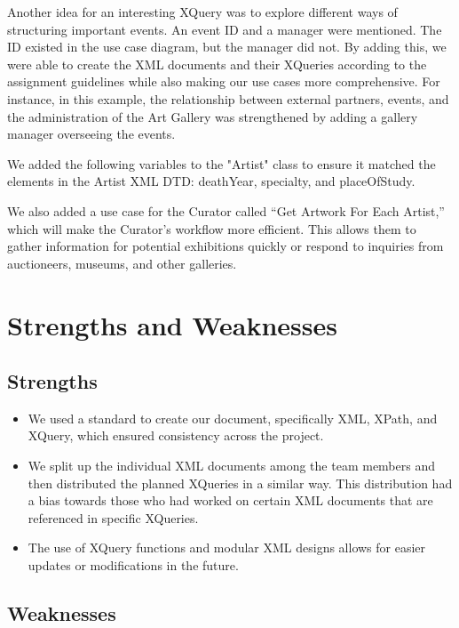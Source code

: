 \documentclass{article} %
\begin{document}
Another idea for an interesting XQuery was to explore different ways of structuring 
important events. An event ID and a manager were mentioned. The ID existed in the use 
case diagram, but the manager did not. By adding this, we were able to create the XML 
documents and their XQueries according to the assignment guidelines while also making 
our use cases more comprehensive. For instance, in this example, the relationship 
between external partners, events, and the administration of the Art Gallery was 
strengthened by adding a gallery manager overseeing the events.

We added the following variables to the "Artist" class to ensure it matched the 
elements in the Artist XML DTD: deathYear, specialty, and placeOfStudy.

We also added a use case for the Curator called “Get Artwork For Each Artist,” which 
will make the Curator's workflow more efficient. This allows them to gather 
information for potential exhibitions quickly or respond to inquiries from auctioneers, 
museums, and other galleries.

\section{Strengths and Weaknesses}
\subsection{Strengths}

\begin{itemize}
    \item We used a standard to create our document, specifically XML, XPath, and XQuery, which ensured consistency across the project.
    \item We split up the individual XML documents among the team members and then distributed the planned XQueries in a similar way. This distribution had a bias towards those who had worked on certain XML documents that are referenced in specific XQueries.
    \item The use of XQuery functions and modular XML designs allows for easier updates or modifications in the future.
\end{itemize}

\subsection{Weaknesses}
\end{document}
